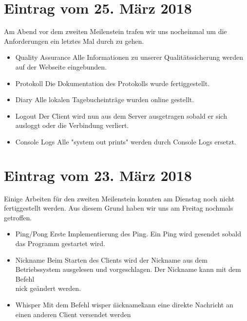 \documentclass{scrartcl}
\newcommand{\n}{\newline}
\begin{document}
\section*{Eintrag vom 25. März 2018}
Am Abend vor dem zweiten Meilenstein trafen wir uns nocheinmal um die Anforderungen ein letztes Mal durch zu gehen.
\begin{itemize}
	\item Quality Assurance \n
	Alle Informationen zu unserer Qualitätssicherung werden auf der Webseite eingebunden.
	\item Protokoll \n
	Die Dokumentation des Protokolls wurde fertiggestellt.
	\item Diary \n
	Alle lokalen Tagebucheinträge wurden online gestellt.
	\item Logout \n
	Der Client wird nun aus dem Server ausgetragen sobald er sich ausloggt oder die Verbindung verliert.
	\item Console Logs \n
	Alle "system out prints" werden durch Console Logs ersetzt.
\end{itemize}

\section*{Eintrag vom 23. März 2018}
Einige Arbeiten für den zweiten Meilenstein konnten am Dienstag noch nicht fertiggestellt werden. Aus diesem Grund haben wir uns am Freitag nochmals getroffen.
\begin{itemize}
	\item Ping/Pong \n
	Erste Implementierung des Ping. Ein Ping wird gesendet sobald das Programm gestartet wird.
	\item Nickname \n
	Beim Starten des Clients wird der Nickname aus dem Betriebssystem ausgelesen und vorgeschlagen. Der Nickname kann mit dem Befehl \\nick geändert werden.
	\item Whisper \n
	Mit dem Befehl \/wisper \"nickname\" kann eine direkte Nachricht an einen anderen Client versendet werden
\end{itemize}

\end{document}
